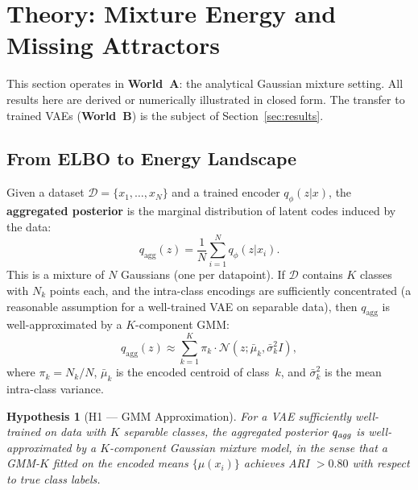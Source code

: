 \documentclass[11pt]{article}
\newtheorem{hypothesis}{Hypothesis}
\begin{document}
\section{Theory: Mixture Energy and Missing Attractors}
\label{sec:theory}

This section operates in \textbf{World~A}: the analytical Gaussian mixture
setting.
All results here are derived or numerically illustrated in closed form.
The transfer to trained VAEs (\textbf{World~B}) is the subject of
Section~\ref{sec:results}.

\subsection{From ELBO to Energy Landscape}
\label{sec:elbo_energy}

Given a dataset $\mathcal{D} = \{x_1, \ldots, x_N\}$ and a trained encoder
$q_\phi(z|x)$, the \textbf{aggregated posterior} is the marginal distribution
of latent codes induced by the data:
\begin{equation}
\label{eq:qagg}
q_{\text{agg}}(z) = \frac{1}{N} \sum_{i=1}^{N} q_\phi(z|x_i).
\end{equation}
This is a mixture of $N$ Gaussians (one per datapoint).
If $\mathcal{D}$ contains $K$ classes with $N_k$ points each, and the
intra-class encodings are sufficiently concentrated (a reasonable assumption
for a well-trained VAE on separable data), then $q_{\text{agg}}$ is
well-approximated by a $K$-component GMM:
\begin{equation}
\label{eq:qagg_gmm}
q_{\text{agg}}(z) \approx \sum_{k=1}^{K} \pi_k \cdot
  \mathcal{N}(z; \bar{\mu}_k, \bar{\sigma}_k^2 I),
\end{equation}
where $\pi_k = N_k / N$, $\bar{\mu}_k$ is the encoded centroid of class~$k$,
and $\bar{\sigma}_k^2$ is the mean intra-class variance.

\begin{hypothesis}[H1 --- GMM Approximation]
\label{hyp:h1}
For a VAE sufficiently well-trained on data with $K$ separable classes,
the aggregated posterior $q_{\emph{agg}}$ is well-approximated by a
$K$-component Gaussian mixture model, in the sense that a GMM-$K$ fitted
on the encoded means $\{\mu(x_i)\}$ achieves ARI $> 0.80$ with respect to
true class labels.
\end{hypothesis}
\end{document}
